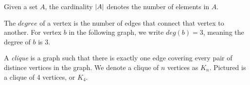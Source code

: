 \documentclass[11pt]{article}
\begin{document}
\begin{definition}
\label{def:cardinality}
Given a set $A$, the cardinality $\left\lvert A \right\rvert$ denotes the number of elements in $A$.
\end{definition}

\begin{definition}
\label{def:degree}
The $degree$ of a vertex is the number of edges that connect that vertex to another. For vertex $b$ in the following graph, we write $deg(b) = 3$,
meaning the degree of $b$ is 3.
\begin{center}
\end{center}
\end{definition}

\begin{definition}
\label{def:clique}
A \textit{clique} is a graph such that there is exactly one edge covering every pair of distince vertices in the graph.
We denote a clique of $n$ vertices as $K_n$.
Pictured is a clique of 4 vertices, or $K_4$.
\begin{center}
\end{center}
\end{definition}
\end{document}
